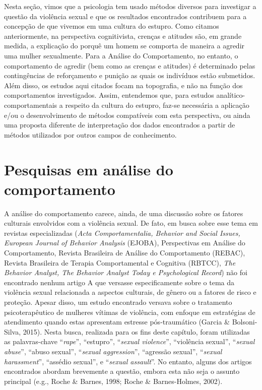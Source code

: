Nesta seção, vimos que a psicologia tem usado métodos diversos para investigar a questão da violência sexual e que os resultados encontrados contribuem para a concepção de que vivemos em uma cultura do estupro. Como citamos anteriormente, na perspectiva cognitivista, crenças e atitudes são, em grande medida, a explicação do porquê um homem se comporta de maneira a agredir uma mulher sexualmente. Para a Análise do Comportamento, no entanto, o comportamento de agredir (bem como as crenças e atitudes) é determinado pelas contingências de reforçamento e punição as quais os indivíduos estão submetidos. Além disso, os estudos aqui citados focam na topografia, e não na função dos comportamentos investigados. Assim, entendemos que, para estudos analítico-comportamentais a respeito da cultura do estupro, faz-se necessária a aplicação e/ou o desenvolvimento de métodos compatíveis com esta perspectiva, ou ainda uma proposta diferente de interpretação dos dados encontrados a partir de métodos utilizados por outros campos de conhecimento.

\section*{Pesquisas em análise do comportamento}

A análise do comportamento carece, ainda, de uma discussão sobre os fatores culturais envolvidos com a violência sexual. De fato, em busca sobre esse tema em revistas especializadas (\textit{Acta Comportamentalia, Behavior and Social Issues, European Journal of Behavior Analysis} (EJOBA), Perspectivas em Análise do Comportamento, Revista Brasileira de Análise do Comportamento (REBAC), Revista Brasileira de Terapia Comportamental e Cognitiva (RBTCC), \textit{The Behavior Analyst, The Behavior Analyst Today e Psychological Record}) não foi encontrado nenhum artigo A que versasse especificamente sobre o tema da violência sexual relacionada a aspectos culturais, de gênero ou a fatores de risco e proteção. Apesar disso, um estudo encontrado versava sobre o tratamento psicoterapêutico de mulheres vítimas de violência, com enfoque em estratégias de atendimento quando estas apresentam estresse pós-traumático (Garcia \& Bolsoni-Silva, 2015). Nesta busca, realizada para os fins deste capítulo, foram utilizadas as palavras-chave ``\textit{rape}'', ``estupro'', ``\textit{sexual violence}'', ``violência sexual'', ``\textit{sexual abuse}'', ``abuso sexual'', ``\textit{sexual aggression}'', ``agressão sexual'', ``\textit{sexual harassment}'', ``assédio sexual'', e ``\textit{sexual assault}''. No entanto, alguns dos artigos encontrados abordam brevemente a questão, embora esta não seja o assunto principal (e.g., Roche \& Barnes, 1998; Roche \& Barnes-Holmes, 2002).


